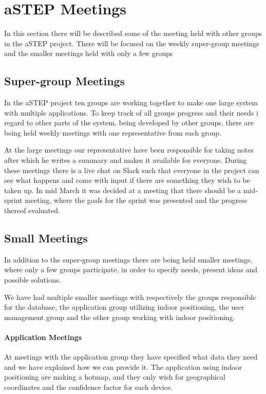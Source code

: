 \section{aSTEP Meetings}
In this section there will be described some of the meeting held with other groups in the aSTEP project. There will be focused on the weekly super-group meetings and the smaller meetings held with only a few groups

\subsection{Super-group Meetings}
In the aSTEP project ten groups are working together to make one large system with multiple applications. To keep track of all groups progress and their needs i regard to other parts of the system, being developed by other groups, there are being held weekly meetings with one representative from each group.

At the large meetings our representative have been responsible for taking notes after which he writes a summary and makes it available for everyone. During these meetings there is a live chat on Slack such that everyone in the project can see what happens and come with input if there are something they wish to be taken up. In mid March it was decided at a meeting that there should be a mid-sprint meeting, where the goals for the sprint was presented and the progress thereof evaluated.

\subsection{Small Meetings}
In addition to the super-group meetings there are being held smaller meetings, where only a few groups participate, in order to specify needs, present ideas and possible solutions.

We have had multiple smaller meetings with respectively the groups responsible for the database, the application group utilizing indoor positioning, the user management group and the other group working with indoor positioning.
 
\paragraph{Application Meetings}
At meetings with the application group they have specified what data they need and we have explained how we can provide it. The application using indoor positioning are making a hotmap, and they only wish for geographical coordinates and the confidence factor for each device.

